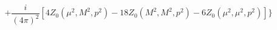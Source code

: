 \begin{equation}
+\frac{i}{(4\pi )^{2}}[4Z_{0}(\mu
^{2},M^{2},p^{2})-18Z_{0}(M^{2},M^{2},p^{2})-6Z_{0}(\mu ^{2},\mu ^{2},p^{2})]\}
\end{equation}

